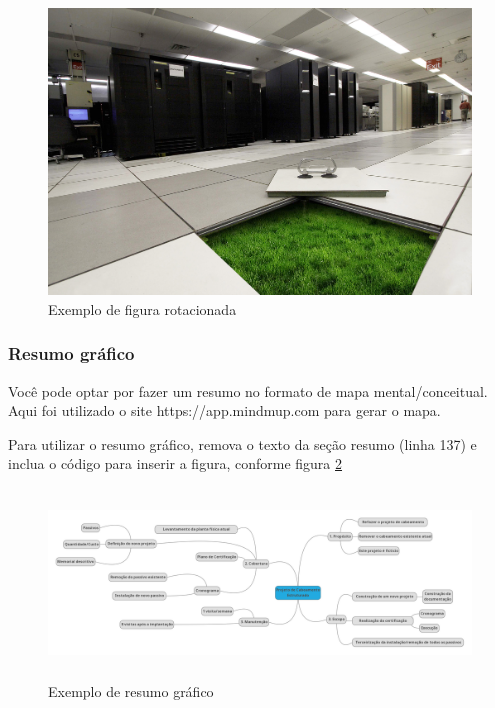 \documentclass[	DIV=calc,%
							paper=a4,%
							fontsize=12pt,%
							onecolumn]{scrartcl}	 					%
\begin{document}
\begin{figure}
	\centering
	\includegraphics[height=\textwidth,angle=-90]{fig3}
	\caption{Exemplo de figura rotacionada}
	\label{fig3}
\end{figure}



\subsubsection{Resumo gráfico}

Você pode optar por fazer um resumo no formato de mapa mental/conceitual. 
Aqui foi utilizado o site https://app.mindmup.com para gerar o mapa.

Para utilizar o resumo gráfico, remova o texto da seção resumo (linha 137) e inclua o código para inserir a figura, conforme figura \ref{fig4}

\begin{figure}[h]
	\centering
	\includegraphics[width=\textwidth,height=5cm,keepaspectratio]{fig4}
	\caption{Exemplo de resumo gráfico}
	\label{fig4}	
\end{figure}

\end{document}
